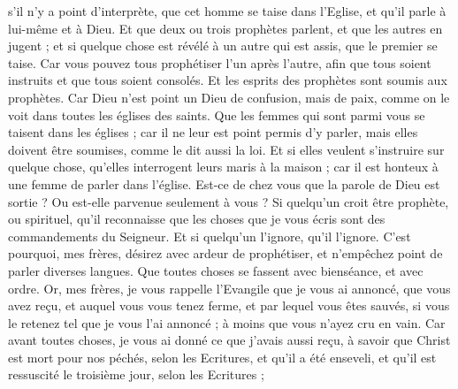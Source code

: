 \begin{multicols}{2}
s'il n'y a point d'interprète, que cet homme se taise dans l'Eglise, et qu'il parle à lui-même et à Dieu.
Et que deux ou trois prophètes parlent, et que les autres en jugent ;
et si quelque chose est révélé à un autre qui est assis, que le premier se taise.
Car vous pouvez tous prophétiser l'un après l'autre, afin que tous soient instruits et que tous soient consolés.
Et les esprits des prophètes sont soumis aux prophètes.
Car Dieu n'est point un Dieu de confusion, mais de paix, comme on le voit dans toutes les églises des saints.
Que les femmes qui sont parmi vous se taisent dans les églises ; car il ne leur est point permis d'y parler, mais elles doivent être soumises, comme le dit aussi la loi.
Et si elles veulent s'instruire sur quelque chose, qu'elles interrogent leurs maris à la maison ; car il est honteux à une femme de parler dans l'église.
Est-ce de chez vous que la parole de Dieu est sortie ? Ou est-elle parvenue seulement à vous ?
Si quelqu'un croit être prophète, ou spirituel, qu'il reconnaisse que les choses que je vous écris sont des commandements du Seigneur.
Et si quelqu'un l'ignore, qu'il l'ignore.
C'est pourquoi, mes frères, désirez avec ardeur de prophétiser, et n'empêchez point de parler diverses langues.
Que toutes choses se fassent avec bienséance, et avec ordre.
\VerseOne{}Or, mes frères, je vous rappelle l'Evangile que je vous ai annoncé, que vous avez reçu, et auquel vous vous tenez ferme,
et par lequel vous êtes sauvés, si vous le retenez tel que je vous l'ai annoncé ; à moins que vous n'ayez cru en vain. 
Car avant toutes choses, je vous ai donné ce que j'avais aussi reçu, à savoir que Christ est mort pour nos péchés, selon les Ecritures,
et qu'il a été enseveli, et qu'il est ressuscité le troisième jour, selon les Ecritures ;

\end{multicols}

